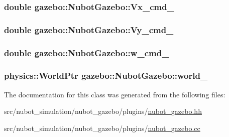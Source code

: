 \hypertarget{classgazebo_1_1NubotGazebo_af17747304ff9b241fa0642c52923498b}{
\subsubsection[{Vx\-\_\-cmd\-\_\-}]{\setlength{\rightskip}{0pt plus 5cm}double gazebo\-::\-Nubot\-Gazebo\-::\-Vx\-\_\-cmd\-\_\-\hspace{0.3cm}{\ttfamily [private]}}}\label{classgazebo_1_1NubotGazebo_af17747304ff9b241fa0642c52923498b}
\hypertarget{classgazebo_1_1NubotGazebo_a977c91e62fed23c5fb9233e5d38ad597}{
\subsubsection[{Vy\-\_\-cmd\-\_\-}]{\setlength{\rightskip}{0pt plus 5cm}double gazebo\-::\-Nubot\-Gazebo\-::\-Vy\-\_\-cmd\-\_\-\hspace{0.3cm}{\ttfamily [private]}}}\label{classgazebo_1_1NubotGazebo_a977c91e62fed23c5fb9233e5d38ad597}
\hypertarget{classgazebo_1_1NubotGazebo_aebc0851c9ab6da1d1c96d470e72758f8}{
\subsubsection[{w\-\_\-cmd\-\_\-}]{\setlength{\rightskip}{0pt plus 5cm}double gazebo\-::\-Nubot\-Gazebo\-::w\-\_\-cmd\-\_\-\hspace{0.3cm}{\ttfamily [private]}}}\label{classgazebo_1_1NubotGazebo_aebc0851c9ab6da1d1c96d470e72758f8}
\hypertarget{classgazebo_1_1NubotGazebo_aa56e5c10cfbbc981460ab1bcc204d071}{
\subsubsection[{world\-\_\-}]{\setlength{\rightskip}{0pt plus 5cm}physics\-::\-World\-Ptr gazebo\-::\-Nubot\-Gazebo\-::world\-\_\-\hspace{0.3cm}{\ttfamily [private]}}}\label{classgazebo_1_1NubotGazebo_aa56e5c10cfbbc981460ab1bcc204d071}


The documentation for this class was generated from the following files\-:\begin{DoxyCompactItemize}
\item 
src/nubot\-\_\-simulation/nubot\-\_\-gazebo/plugins/\hyperlink{nubot__gazebo_8hh}{nubot\-\_\-gazebo.\-hh}\item 
src/nubot\-\_\-simulation/nubot\-\_\-gazebo/plugins/\hyperlink{nubot__gazebo_8cc}{nubot\-\_\-gazebo.\-cc}\end{DoxyCompactItemize}
